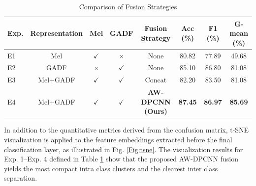 \documentclass[journal]{IEEEtran}
\begin{document}
\begin{table}
	\centering
	\caption{Comparison of Fusion Strategies}
	\begin{tabular}{lccccccc}
		\toprule
		\textbf{Exp.} & \textbf{Representation} & \textbf{Mel} & \textbf{GADF} & \textbf{Fusion Strategy} 
		& \textbf{Acc (\%)} & \textbf{F1 (\%)} & \textbf{G-mean (\%)} \\
		\midrule
		E1 & Mel      & $\checkmark$ & $\times$ & None  
		& 80.82 & 77.89 & 49.68 \\
		E2 & GADF     & $\times$ & $\checkmark$ & None 
		& 85.10 & 86.80 & 81.08 \\
		E3 & Mel+GADF & $\checkmark$ & $\checkmark$ & Concat 
		& 82.20 & 83.50 & 81.08 \\
		E4 & Mel+GADF & $\checkmark$ & $\checkmark$ & \textbf{AW-DPCNN (Ours)} 
		& \textbf{87.45} & \textbf{86.97} & \textbf{85.69} \\
		\bottomrule
	\end{tabular}
	\label{tab:fusion_exp_simple}
\end{table}



In addition to the quantitative metrics derived from the confusion matrix, t-SNE visualization is applied to the feature embeddings extracted before the final classification layer, as illustrated in Fig. \ref{Fig:tsne}. The visualization results for Exp. 1–Exp. 4 defined in Table \ref{tab:fusion_exp_simple} show that the proposed AW-DPCNN fusion yields the most compact intra class clusters and the clearest inter class separation.
\end{document}
